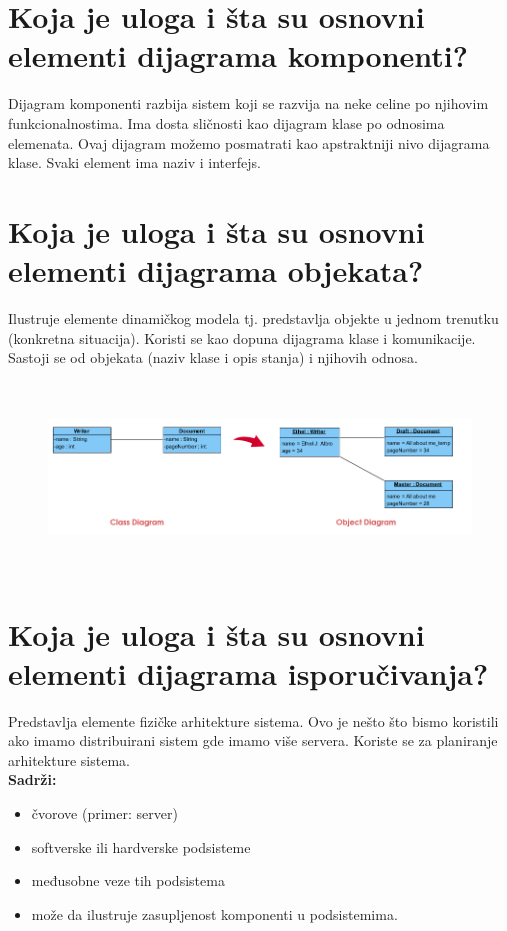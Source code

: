 \documentclass[a4paper]{article}
\begin{document}
\section{Koja je uloga i šta su osnovni elementi dijagrama komponenti?}
  Dijagram komponenti razbija sistem koji se razvija na neke celine po njihovim funkcionalnostima.
  Ima dosta sličnosti kao dijagram klase po odnosima elemenata. Ovaj dijagram možemo posmatrati
  kao apstraktniji nivo dijagrama klase. Svaki element ima naziv i interfejs.

\section{Koja je uloga i šta su osnovni elementi dijagrama objekata?}
  Ilustruje elemente dinamičkog modela tj. predstavlja objekte u jednom trenutku (konkretna situacija). 
  Koristi se kao dopuna dijagrama klase i komunikacije. Sastoji se od objekata (naziv klase i opis stanja)
  i njihovih odnosa.
  \begin{figure}[H]
    \begin{center}
        \includegraphics[width=120mm,height=50mm]{Slike/uml_objekat.png}
    \end{center}
  \end{figure} 

\section{Koja je uloga i šta su osnovni elementi dijagrama isporučivanja?}
  Predstavlja elemente fizičke arhitekture sistema. Ovo je nešto što bismo koristili 
  ako imamo distribuirani sistem gde imamo više servera. 
  Koriste se za planiranje arhitekture sistema. \\
  \textbf{Sadrži:}
  \begin{itemize} 
    \item čvorove (primer: server) 
    \item softverske ili hardverske podsisteme
    \item međusobne veze tih podsistema
    \item može da ilustruje zasupljenost komponenti u podsistemima.
  \end{itemize}
\end{document}
